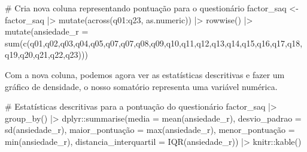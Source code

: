 \documentclass[
  letterpaper,
  DIV=11,
  numbers=noendperiod]{scrartcl}
\newenvironment{Shaded}{\begin{snugshade}}{\end{snugshade}}
\newcommand{\AttributeTok}[1]{\textcolor[rgb]{0.40,0.45,0.13}{#1}}
\newcommand{\CommentTok}[1]{\textcolor[rgb]{0.37,0.37,0.37}{#1}}
\newcommand{\FunctionTok}[1]{\textcolor[rgb]{0.28,0.35,0.67}{#1}}
\newcommand{\NormalTok}[1]{\textcolor[rgb]{0.00,0.23,0.31}{#1}}
\newcommand{\OtherTok}[1]{\textcolor[rgb]{0.00,0.23,0.31}{#1}}
\newcommand{\SpecialCharTok}[1]{\textcolor[rgb]{0.37,0.37,0.37}{#1}}
\begin{document}
\begin{Shaded}
\begin{Highlighting}[]
\CommentTok{\# Cria nova coluna representando pontuação para o questionário}
\NormalTok{factor\_saq }\OtherTok{\textless{}{-}}\NormalTok{ factor\_saq }\SpecialCharTok{|\textgreater{}} 
  \FunctionTok{mutate}\NormalTok{(}\FunctionTok{across}\NormalTok{(q01}\SpecialCharTok{:}\NormalTok{q23, as.numeric)) }\SpecialCharTok{|\textgreater{}} 
  \FunctionTok{rowwise}\NormalTok{() }\SpecialCharTok{|\textgreater{}} 
  \FunctionTok{mutate}\NormalTok{(}\AttributeTok{ansiedade\_r =} \FunctionTok{sum}\NormalTok{(}\FunctionTok{c}\NormalTok{(q01,q02,q03,q04,q05,q07,q07,q08,q09,q10,q11,q12,q13,q14,q15,q16,q17,q18,q19,q20,q21,q22,q23)))}
\end{Highlighting}
\end{Shaded}

Com a nova coluna, podemos agora ver as estatísticas descritivas e fazer
um gráfico de densidade, o nosso somatório representa uma variável
numérica.

\begin{Shaded}
\begin{Highlighting}[]
\CommentTok{\# Estatísticas descritivas para a pontuação do questionário}
\NormalTok{factor\_saq }\SpecialCharTok{|\textgreater{}} 
  \FunctionTok{group\_by}\NormalTok{() }\SpecialCharTok{|\textgreater{}} 
\NormalTok{  dplyr}\SpecialCharTok{::}\FunctionTok{summarise}\NormalTok{(}\AttributeTok{media =} \FunctionTok{mean}\NormalTok{(ansiedade\_r), }\AttributeTok{desvio\_padrao =} \FunctionTok{sd}\NormalTok{(ansiedade\_r), maior\_pontuação }\OtherTok{=} \FunctionTok{max}\NormalTok{(ansiedade\_r), menor\_pontuação }\OtherTok{=} \FunctionTok{min}\NormalTok{(ansiedade\_r), }\AttributeTok{distancia\_interquartil =} \FunctionTok{IQR}\NormalTok{(ansiedade\_r)) }\SpecialCharTok{|\textgreater{}} 
\NormalTok{  knitr}\SpecialCharTok{::}\FunctionTok{kable}\NormalTok{()}
\end{Highlighting}
\end{Shaded}
\end{document}
